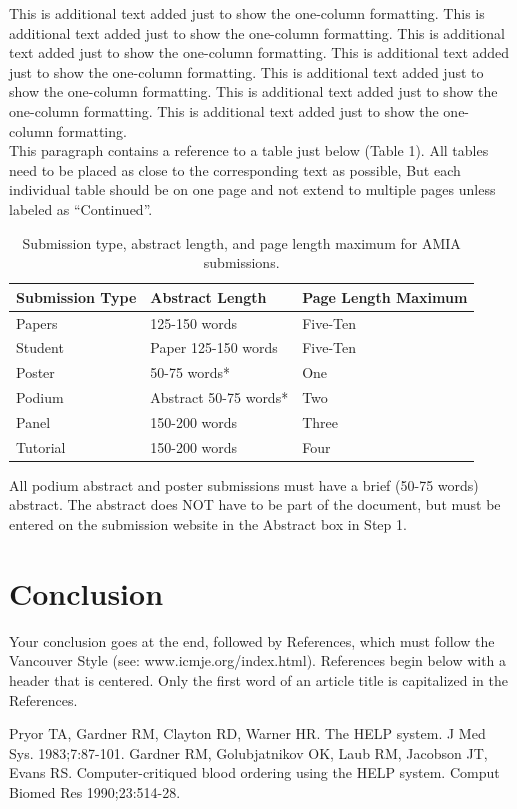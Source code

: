 \documentclass{amia}
\begin{document}
This is additional text added just to show the one-column formatting.  This is additional text added just to show the one-column formatting.  This is additional text added just to show the one-column formatting.  This is additional text added just to show the one-column formatting.  This is additional text added just to show the one-column formatting.  This is additional text added just to show the one-column formatting.  This is additional text added just to show the one-column formatting.\\
This paragraph contains a reference to a table just below (Table 1).  All tables need to be placed as close to the corresponding text as possible, But each individual table should be on one page and not extend to multiple pages unless labeled as “Continued”.\\
\begin{table}[!ht]
\centering
\caption{Submission type, abstract length, and page length maximum for AMIA submissions.}
  \begin{tabular}{|l|l|l|}
  \hline
    \textbf{Submission Type}    & \textbf{Abstract Length}  & \textbf{Page Length Maximum} \\ \hline
    Papers   & 125-150 words  & Five-Ten   \\ \hline
    Student &Paper   125-150 words  & Five-Ten \\ \hline
    Poster  &50-75 words*   & One \\ \hline
    Podium  &Abstract 50-75 words*  & Two \\ \hline
    Panel   &150-200 words  & Three \\ \hline
    Tutorial    &150-200 words  & Four \\ \hline
  \end{tabular}
\end{table}

All podium abstract and poster submissions must have a brief (50-75 words) abstract. The abstract does NOT have to be part of the document, but must be entered on the submission website in the Abstract box in Step 1.
\section*{Conclusion}
Your conclusion goes at the end, followed by References, which must follow the Vancouver Style (see: www.icmje.org/index.html).  References begin below with a header that is centered.  Only the first word of an article title is capitalized in the References.

\makeatletter
\renewcommand{\@biblabel}[1]{\hfill #1.}
\makeatother



{\footnotesize

\begin{thebibliography}{1}
\setlength\itemsep{-0.1em}

Pryor TA, Gardner RM, Clayton RD, Warner HR. The HELP system. J Med Sys. 1983;7:87-101.
Gardner RM, Golubjatnikov OK, Laub RM, Jacobson JT, Evans RS. Computer-critiqued blood ordering using the HELP system. Comput Biomed Res 1990;23:514-28.



\end{thebibliography}
}
\end{document}
